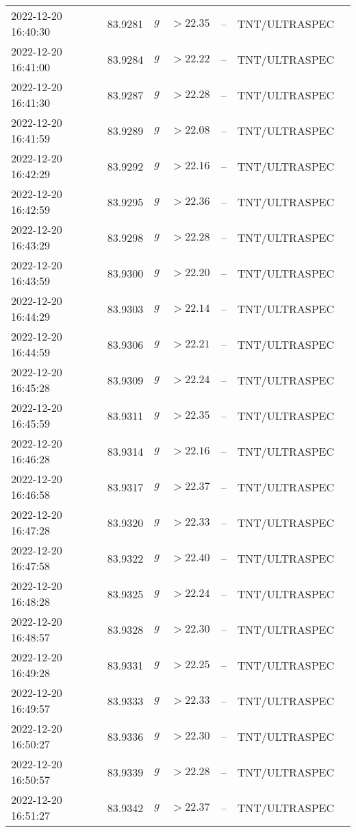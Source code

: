 \documentclass{nature_plusfigure}
\begin{document}
\begin{supplement}
\begin{center}
\begin{longtable}{lllllll}
2022-12-20 16:40:30 & 83.9281 & $g$ & $>22.35$ & -- & TNT/ULTRASPEC &  \\ 
2022-12-20 16:41:00 & 83.9284 & $g$ & $>22.22$ & -- & TNT/ULTRASPEC &  \\ 
2022-12-20 16:41:30 & 83.9287 & $g$ & $>22.28$ & -- & TNT/ULTRASPEC &  \\ 
2022-12-20 16:41:59 & 83.9289 & $g$ & $>22.08$ & -- & TNT/ULTRASPEC &  \\ 
2022-12-20 16:42:29 & 83.9292 & $g$ & $>22.16$ & -- & TNT/ULTRASPEC &  \\ 
2022-12-20 16:42:59 & 83.9295 & $g$ & $>22.36$ & -- & TNT/ULTRASPEC &  \\ 
2022-12-20 16:43:29 & 83.9298 & $g$ & $>22.28$ & -- & TNT/ULTRASPEC &  \\ 
2022-12-20 16:43:59 & 83.9300 & $g$ & $>22.20$ & -- & TNT/ULTRASPEC &  \\ 
2022-12-20 16:44:29 & 83.9303 & $g$ & $>22.14$ & -- & TNT/ULTRASPEC &  \\ 
2022-12-20 16:44:59 & 83.9306 & $g$ & $>22.21$ & -- & TNT/ULTRASPEC &  \\ 
2022-12-20 16:45:28 & 83.9309 & $g$ & $>22.24$ & -- & TNT/ULTRASPEC &  \\ 
2022-12-20 16:45:59 & 83.9311 & $g$ & $>22.35$ & -- & TNT/ULTRASPEC &  \\ 
2022-12-20 16:46:28 & 83.9314 & $g$ & $>22.16$ & -- & TNT/ULTRASPEC &  \\ 
2022-12-20 16:46:58 & 83.9317 & $g$ & $>22.37$ & -- & TNT/ULTRASPEC &  \\ 
2022-12-20 16:47:28 & 83.9320 & $g$ & $>22.33$ & -- & TNT/ULTRASPEC &  \\ 
2022-12-20 16:47:58 & 83.9322 & $g$ & $>22.40$ & -- & TNT/ULTRASPEC &  \\ 
2022-12-20 16:48:28 & 83.9325 & $g$ & $>22.24$ & -- & TNT/ULTRASPEC &  \\ 
2022-12-20 16:48:57 & 83.9328 & $g$ & $>22.30$ & -- & TNT/ULTRASPEC &  \\ 
2022-12-20 16:49:28 & 83.9331 & $g$ & $>22.25$ & -- & TNT/ULTRASPEC &  \\ 
2022-12-20 16:49:57 & 83.9333 & $g$ & $>22.33$ & -- & TNT/ULTRASPEC &  \\ 
2022-12-20 16:50:27 & 83.9336 & $g$ & $>22.30$ & -- & TNT/ULTRASPEC &  \\ 
2022-12-20 16:50:57 & 83.9339 & $g$ & $>22.28$ & -- & TNT/ULTRASPEC &  \\ 
2022-12-20 16:51:27 & 83.9342 & $g$ & $>22.37$ & -- & TNT/ULTRASPEC &  \\ 

\end{longtable}
\end{center}
\end{supplement}
\end{document}
